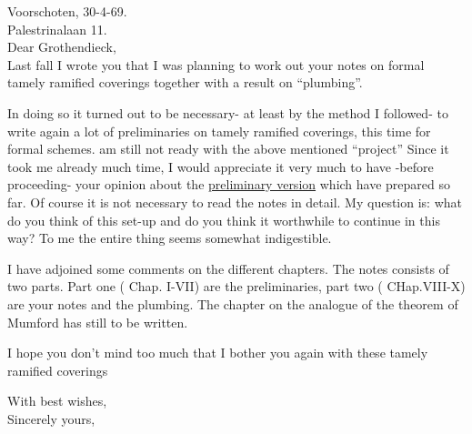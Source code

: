 Voorschoten, 30-4-69.\\
Palestrinalaan 11.\\

Dear Grothendieck,\\

Last fall I wrote you that I was planning to work out your notes on formal tamely ramified coverings together with a result on ``plumbing''.

In doing so it turned out to be necessary- at least by the method I followed- to write again a lot of preliminaries on tamely ramified coverings, this time for formal schemes.  am still not ready with the above mentioned ``project''\handwritten{!} Since it took me already much time, I would appreciate it very much to have -before proceeding- your opinion about the \uline{preliminary version} which  have prepared so far. Of course it is not necessary to read the notes in detail. My question is: what do you think of this set-up and do you think it worthwhile to continue in this way? To me the entire thing seems somewhat indigestible.

I have adjoined some comments on the different chapters. The notes consists of two parts. Part one ( Chap. I-VII) are the preliminaries, part two ( CHap.VIII-X) are your notes and the plumbing. The chapter on the analogue of the theorem of Mumford has still to be written.

I hope you don't mind too much that I bother you again with these tamely ramified coverings\handwritten{!}

With best wishes,\\
Sincerely yours,\\
\\
